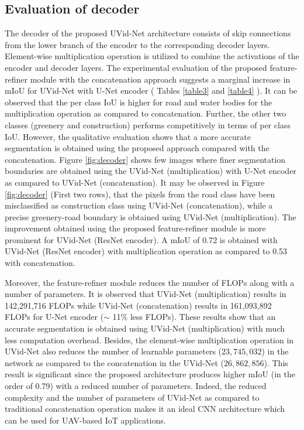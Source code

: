 \documentclass[journal]{IEEEtran}
\begin{document}
\subsection{Evaluation of decoder}
\label{Sec:Decoder}
The decoder of the proposed UVid-Net architecture consists of skip connections from the lower branch of the encoder to the corresponding decoder layers. Element-wise multiplication operation is utilized to combine the activations of the encoder and decoder layers. The experimental evaluation of the proposed feature-refiner module with the concatenation approach suggests a marginal increase in mIoU for UVid-Net with U-Net encoder ( Tables \ref{table3} and \ref{table4} ).  It can be observed that the per class IoU is higher for road and water bodies for the multiplication operation as compared to concatenation. Further, the other two classes (greenery and construction) performs competitively in terms of per class IoU. However, the qualitative evaluation shows that a more accurate segmentation is obtained using the proposed approach compared with the concatenation. Figure \ref{fig:decoder} shows few images where finer segmentation boundaries are obtained using the UVid-Net (multiplication) with U-Net encoder as compared to UVid-Net (concatenation). It may be observed in Figure \ref{fig:decoder} (First two rows), that the pixels from the road class have been misclassified as construction class using UVid-Net (concatenation), while a precise greenery-road boundary is obtained using UVid-Net (multiplication).  The improvement obtained using the proposed feature-refiner module is more prominent for UVid-Net (ResNet encoder).  A mIoU of 0.72 is obtained with UVid-Net (ResNet encoder) with multiplication operation as compared to 0.53 with concatenation. 



Moreover, the feature-refiner module reduces the number of FLOPs along with a number of parameters. It is observed that UVid-Net (multiplication) results in 142,291,716 FLOPs while UVid-Net (concatenation) results in 161,093,892 FLOPs for U-Net encoder ($\sim$ 11\% less FLOPs). These results show that an accurate segmentation is obtained using UVid-Net (multiplication) with much less computation overhead. Besides, the element-wise multiplication operation in UVid-Net also reduces the number of learnable parameters  ($23,745,032$) in the network as compared to the concatenation in the UVid-Net ($26,862,856$). This result is significant since the proposed architecture produces higher mIoU (in the order of 0.79) with a reduced number of parameters. Indeed, the reduced complexity and the number of parameters of UVid-Net as compared to traditional concatenation operation makes it an ideal CNN architecture which can be used for UAV-based IoT applications.
\end{document}
